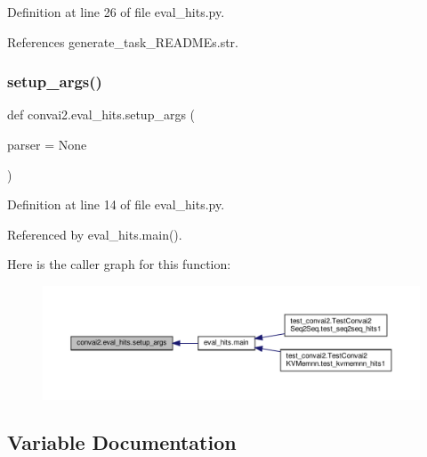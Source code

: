 Definition at line 26 of file eval\+\_\+hits.\+py.



References generate\+\_\+task\+\_\+\+R\+E\+A\+D\+M\+Es.\+str.

\mbox{\label{namespaceconvai2_1_1eval__hits_a3c68be2e1a546ad88843f387bf865deb}} 
\subsubsection{\texorpdfstring{setup\+\_\+args()}{setup\_args()}}
{\footnotesize\ttfamily def convai2.\+eval\+\_\+hits.\+setup\+\_\+args (\begin{DoxyParamCaption}\item[{}]{parser = {\ttfamily None} }\end{DoxyParamCaption})}



Definition at line 14 of file eval\+\_\+hits.\+py.



Referenced by eval\+\_\+hits.\+main().

Here is the caller graph for this function\+:
\nopagebreak
\begin{figure}[H]
\begin{center}
\leavevmode
\includegraphics[width=350pt]{namespaceconvai2_1_1eval__hits_a3c68be2e1a546ad88843f387bf865deb_icgraph}
\end{center}
\end{figure}


\subsection{Variable Documentation}
\mbox{\label{namespaceconvai2_1_1eval__hits_a82a50b514da37d7bcb6216e90b61561e}} 

